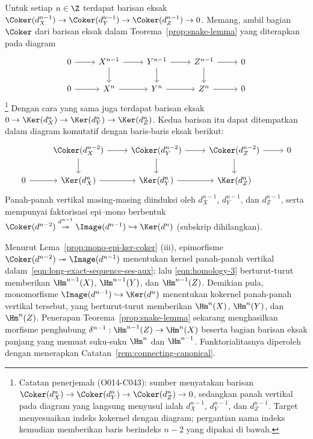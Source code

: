 \begin{bukti}
	Untuk setiap $n\in\Z$ terdapat barisan eksak
	$\Coker(d_X^{n-1})\to\Coker(d_Y^{n-1})\to\Coker(d_Z^{n-1})\to0$.
	Memang, ambil bagian $\Coker$ dari barisan eksak dalam
	Teorema~\ref{prop:snake-lemma} yang diterapkan pada diagram
	\[\begin{tikzcd}
		0 \arrow[r] & X^{n-1} \arrow[r] \arrow[d] & Y^{n-1} \arrow[r] \arrow[d] & Z^{n-1} \arrow[r] \arrow[d] & 0 \\
		0 \arrow[r] & X^n \arrow[r] & Y^n \arrow[r] & Z^n \arrow[r] & 0
	\end{tikzcd}\]%
	\footnote{Catatan penerjemah (O014-C043): sumber menyatakan barisan
	$\Coker(d_X^n)\to\Coker(d_Y^n)\to\Coker(d_Z^n)\to0$, sedangkan panah
	vertikal pada diagram yang langsung menyusul ialah $d_X^{n-1}$,
	$d_Y^{n-1}$, dan $d_Z^{n-1}$. Target menyesuaikan indeks kokernel dengan
	diagram; pergantian nama indeks kemudian memberikan baris berindeks $n-2$
	yang dipakai di bawah.}
	Dengan cara yang sama juga terdapat barisan eksak
	$0\to\Ker(d_X^n)\to\Ker(d_Y^n)\to\Ker(d_Z^n)$. Kedua barisan itu dapat
	ditempatkan dalam diagram komutatif dengan baris-baris eksak berikut:
	\begin{equation}\label{eqn:long-exact-sequence-ses-aux}\begin{tikzcd}
		& \Coker(d_X^{n-2}) \arrow[r] \arrow[d] & \Coker(d_Y^{n-2}) \arrow[r] \arrow[d] & \Coker(d_Z^{n-2}) \arrow[d] \arrow[r] & 0 \\
		0 \arrow[r] & \Ker(d_X^n) \arrow[r] & \Ker(d_Y^n) \arrow[r] & \Ker(d_Z^n) &
	\end{tikzcd}\end{equation}
	Panah-panah vertikal masing-masing diinduksi oleh $d_X^{n-1}$,
	$d_Y^{n-1}$, dan $d_Z^{n-1}$, serta mempunyai faktorisasi epi--mono
	berbentuk
	$\Coker(d^{n-2})\stackrel{d^{n-1}}{\twoheadrightarrow}
	\Image(d^{n-1})\hookrightarrow\Ker(d^n)$ (subskrip dihilangkan).

	Menurut Lema~\ref{prop:mono-epi-ker-coker} (iii), epimorfisme
	$\Coker(d^{n-2})\twoheadrightarrow\Image(d^{n-1})$ menentukan kernel
	panah-panah vertikal dalam~\eqref{eqn:long-exact-sequence-ses-aux}; lalu
	\eqref{eqn:homology-3} berturut-turut memberikan $\Hm^{n-1}(X)$,
	$\Hm^{n-1}(Y)$, dan $\Hm^{n-1}(Z)$. Demikian pula, monomorfisme
	$\Image(d^{n-1})\hookrightarrow\Ker(d^n)$ menentukan kokernel
	panah-panah vertikal tersebut, yang berturut-turut memberikan $\Hm^n(X)$,
	$\Hm^n(Y)$, dan $\Hm^n(Z)$. Penerapan Teorema~\ref{prop:snake-lemma}
	sekarang menghasilkan morfisme penghubung
	$\delta^{n-1}:\Hm^{n-1}(Z)\to\Hm^n(X)$ beserta bagian barisan eksak
	panjang yang memuat suku-suku $\Hm^n$ dan $\Hm^{n-1}$. Funktorialitasnya
	diperoleh dengan menerapkan Catatan~\ref{rem:connecting-canonical}.
\end{bukti}

